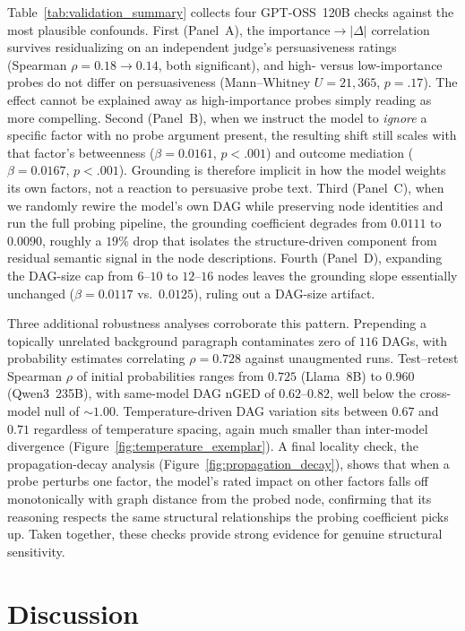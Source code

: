 \documentclass[11pt]{article}
\begin{document}
Table~\ref{tab:validation_summary} collects four GPT-OSS~120B checks against the most plausible confounds. First (Panel~A), the importance$\rightarrow |\Delta|$ correlation survives residualizing on an independent judge's persuasiveness ratings (Spearman $\rho = 0.18 \to 0.14$, both significant), and high- versus low-importance probes do not differ on persuasiveness (Mann--Whitney $U = 21{,}365$, $p = .17$). The effect cannot be explained away as high-importance probes simply reading as more compelling. Second (Panel~B), when we instruct the model to \emph{ignore} a specific factor with no probe argument present, the resulting shift still scales with that factor's betweenness ($\beta = 0.0161$, $p < .001$) and outcome mediation ($\beta = 0.0167$, $p < .001$). Grounding is therefore implicit in how the model weights its own factors, not a reaction to persuasive probe text. Third (Panel~C), when we randomly rewire the model's own DAG while preserving node identities and run the full probing pipeline, the grounding coefficient degrades from $0.0111$ to $0.0090$, roughly a $19\%$ drop that isolates the structure-driven component from residual semantic signal in the node descriptions. Fourth (Panel~D), expanding the DAG-size cap from $6$--$10$ to $12$--$16$ nodes leaves the grounding slope essentially unchanged ($\beta = 0.0117$ vs.\ $0.0125$), ruling out a DAG-size artifact.

Three additional robustness analyses corroborate this pattern. Prepending a topically unrelated background paragraph contaminates zero of $116$ DAGs, with probability estimates correlating $\rho = 0.728$ against unaugmented runs. Test--retest Spearman $\rho$ of initial probabilities ranges from $0.725$ (Llama~8B) to $0.960$ (Qwen3~235B), with same-model DAG nGED of $0.62$--$0.82$, well below the cross-model null of $\sim\!1.00$. Temperature-driven DAG variation sits between $0.67$ and $0.71$ regardless of temperature spacing, again much smaller than inter-model divergence (Figure~\ref{fig:temperature_exemplar}). A final locality check, the propagation-decay analysis (Figure~\ref{fig:propagation_decay}), shows that when a probe perturbs one factor, the model's rated impact on other factors falls off monotonically with graph distance from the probed node, confirming that its reasoning respects the same structural relationships the probing coefficient picks up. Taken together, these checks provide strong evidence for genuine structural sensitivity.

\section{Discussion}
\label{sec:discussion}
\end{document}
